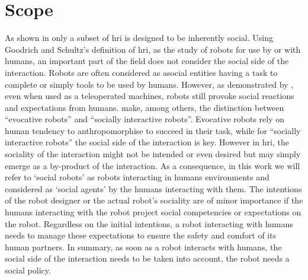 
%
%
%

\section{Scope}\label{sec:intro_scope}

As shown in \cite{goodrich2007human} only a subset of \gls{hri} is designed to be inherently social. Using Goodrich and Schultz's definition of \gls{hri}, as the study of robots for use by or with humans, an important part of the field does not consider the social side of the interaction. Robots are often considered as asocial entities having a task to complete or simply tools to be used by humans. However, as demonstrated by \cite{fincannon2004evidence}, even when used as a teleoperated machines, robots still provoke social reactions and expectations from humans. \cite{fong2003survey} make, among others, the distinction between ``evocative robots'' and ``socially interactive robots''. Evocative robots rely on human tendency to anthropomorphise to succeed in their task, while for ``socially interactive robots'' the social side of the interaction is key. However in \gls{hri}, the sociality of the interaction might not be intended or even desired but may simply emerge as a by-product of the interaction. As a consequence, in this work we will refer to `social robots' as robots interacting in humans environments and considered as `social agents' by the humans interacting with them. The intentions of the robot designer or the actual robot's sociality are of minor importance if the humans interacting with the robot project social competencies or expectations on the robot. Regardless on the initial intentions, a robot interacting with humans needs to manage these expectations to ensure the safety and comfort of its human partners. In summary, as soon as a robot interacts with humans, the social side of the interaction needs to be taken into account, the robot needs a social policy. 

